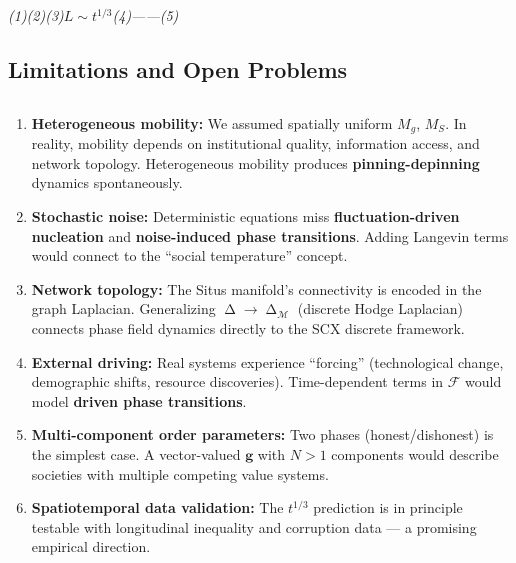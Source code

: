 \documentclass[12pt,a4paper]{article}
\theoremstyle{plain}
\theoremstyle{definition}
\newcommand{\cM}{\mathcal{M}}
\newcommand{\cF}{\mathcal{F}}
\newcommand{\gf}{\mathbf{g}}          %
\DeclareMathOperator{\lap}{\Delta}
\newcommand{\cn}[1]{\textcolor{scxgray}{\textit{#1}}}
\begin{document}
\bigskip
\noindent
\cn{(1)(2)(3)$L\sim t^{1/3}$(4)——(5)}

\subsection{Limitations and Open Problems}
\subsection*{}

\begin{enumerate}[label=(\arabic*)]
    \item \textbf{Heterogeneous mobility:} We assumed spatially uniform $M_g$, $M_S$.
          In reality, mobility depends on institutional quality, information access,
          and network topology. Heterogeneous mobility produces \textbf{pinning-depinning}
          dynamics spontaneously.

    \item \textbf{Stochastic noise:} Deterministic equations miss
          \textbf{fluctuation-driven nucleation} and \textbf{noise-induced phase transitions}.
          Adding Langevin terms would connect to the ``social temperature'' concept.

    \item \textbf{Network topology:} The Situs manifold's connectivity is encoded in
          the graph Laplacian. Generalizing $\lap \to \lap_\cM$ (discrete Hodge Laplacian)
          connects phase field dynamics directly to the SCX discrete framework.

    \item \textbf{External driving:} Real systems experience ``forcing'' (technological
          change, demographic shifts, resource discoveries). Time-dependent terms in
          $\cF$ would model \textbf{driven phase transitions}.

    \item \textbf{Multi-component order parameters:} Two phases (honest/dishonest)
          is the simplest case. A vector-valued $\gf$ with $N>1$ components would
          describe societies with multiple competing value systems.

    \item \textbf{Spatiotemporal data validation:} The $t^{1/3}$ prediction is in
          principle testable with longitudinal inequality and corruption data —
          a promising empirical direction.
\end{enumerate}
\end{document}
